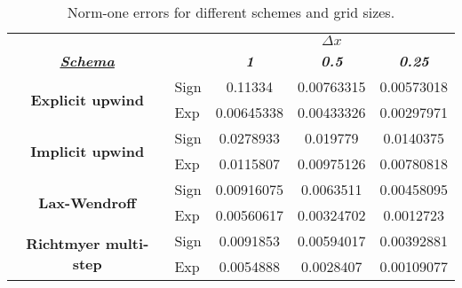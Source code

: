 	\begin{table}[]
		\centering
		\caption{Norm-one errors for different schemes and grid sizes.}
		\label{tab:gridConvergence}
			\begin{tabular}{cl|c|c|c|}
				\cline{3-5}
				\textit{\textbf{}} &  & \multicolumn{3}{c|}{{\ul \textit{\textbf{$\Delta x$}}}} \\ \cline{1-1} \cline{3-5} 
				\multicolumn{1}{|c|}{{\ul \textit{\textbf{Schema}}}} &  & \textit{\textbf{1}} & \textit{\textbf{0.5}} & \textit{\textbf{0.25}} \\ \hline \hline
				\multicolumn{1}{|c|}{\multirow{2}{*}{\textbf{Explicit upwind}}} & Sign & 0.11334 & 0.00763315 & 0.00573018 \\ \cline{2-5} 
				\multicolumn{1}{|l|}{} & Exp & 0.00645338 & 0.00433326 & 0.00297971 \\ \hline
				\multicolumn{1}{|c|}{\multirow{2}{*}{\textbf{Implicit upwind}}} & Sign & 0.0278933 & 0.019779 & 0.0140375 \\ \cline{2-5} 
				\multicolumn{1}{|c|}{} & Exp & 0.0115807 & 0.00975126 & 0.00780818 \\ \hline
				\multicolumn{1}{|c|}{\multirow{2}{*}{\textbf{Lax-Wendroff}}} & Sign & 0.00916075 & 0.0063511 & 0.00458095 \\ \cline{2-5} 
				\multicolumn{1}{|c|}{} & Exp & 0.00560617 & 0.00324702 & 0.0012723 \\ \hline
				\multicolumn{1}{|c|}{\multirow{2}{*}{\textbf{Richtmyer multi-step}}} & Sign & 0.0091853 & 0.00594017 & 0.00392881 \\ \cline{2-5} 
				\multicolumn{1}{|c|}{} & Exp & 0.0054888 & 0.0028407 & 0.00109077 \\ \hline
			\end{tabular}
		\end{table}